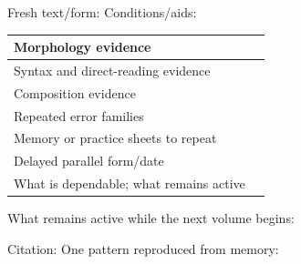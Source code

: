 Fresh text/form: \hrulefill\quad Conditions/aids: \hrulefill
\begin{tabularx}{\linewidth}{@{}P{2.1in}Y@{}}
Morphology evidence & \\\midrule
Syntax and direct-reading evidence & \\\midrule
Composition evidence & \\\midrule
Repeated error families & \\\midrule
Memory or practice sheets to repeat & \\\midrule
Delayed parallel form/date & \\\midrule
What is dependable; what remains active & \\
\end{tabularx}
\vfill
What remains active while the next volume begins:
\RuleLines

Citation: \hrulefill
\RuleLines\RuleLines\RuleLines
\vfill
One pattern reproduced from memory:
\FourRuleLines
